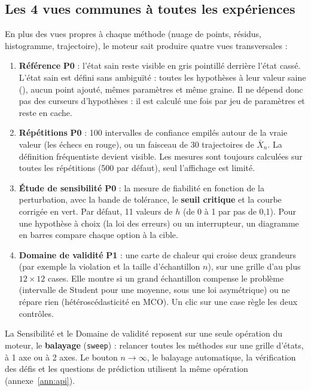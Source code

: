 \documentclass[11pt,a4paper]{article}
\newcommand{\pzero}{\colorbox{ctCorrection!18}{\footnotesize\textbf{P0}}}
\newcommand{\pone}{\colorbox{ctMethod!18}{\footnotesize\textbf{P1}}}
\begin{document}
\subsection{Les 4 vues communes à toutes les expériences}
En plus des vues propres à chaque méthode (nuage de points, résidus, histogramme, trajectoire), le moteur sait produire quatre vues transversales :
\begin{enumerate}[leftmargin=*]
  \item \textbf{Référence} \pzero{} : l'état sain reste visible en gris pointillé derrière l'état cassé. L'état sain est défini sans ambiguïté : toutes les hypothèses à leur valeur saine (), aucun point ajouté, mêmes paramètres et même graine. Il ne dépend donc pas des curseurs d'hypothèses : il est calculé une fois par jeu de paramètres et reste en cache.
  \item \textbf{Répétitions} \pzero{} : 100 intervalles de confiance empilés autour de la vraie valeur (les échecs en rouge), ou un faisceau de 30 trajectoires de $\bar{X}_n$. La définition fréquentiste devient visible. Les mesures sont toujours calculées sur toutes les répétitions (500 par défaut), seul l'affichage est limité.
  \item \textbf{Étude de sensibilité} \pzero{} : la mesure de fiabilité en fonction de la perturbation, avec la bande de tolérance, le \textbf{seuil critique} et la courbe corrigée en vert. Par défaut, 11 valeurs de $h$ (de 0 à 1 par pas de 0,1). Pour une hypothèse à choix (la loi des erreurs) ou un interrupteur, un diagramme en barres compare chaque option à la cible.
  \item \textbf{Domaine de validité} \pone{} : une carte de chaleur qui croise deux grandeurs (par exemple la violation et la taille d'échantillon $n$), sur une grille d'au plus $12 \times 12$ cases. Elle montre si un grand échantillon compense le problème (intervalle de Student pour une moyenne, sous une loi asymétrique) ou ne répare rien (hétéroscédasticité en MCO). Un clic sur une case règle les deux contrôles.
\end{enumerate}
La Sensibilité et le Domaine de validité reposent sur une seule opération du moteur, le \textbf{balayage} (\texttt{sweep}) : relancer toutes les méthodes sur une grille d'états, à 1 axe ou à 2 axes. Le bouton $n \to \infty$, le balayage automatique, la vérification des défis et les questions de prédiction utilisent la même opération (annexe~\ref{ann:api}).
\end{document}
